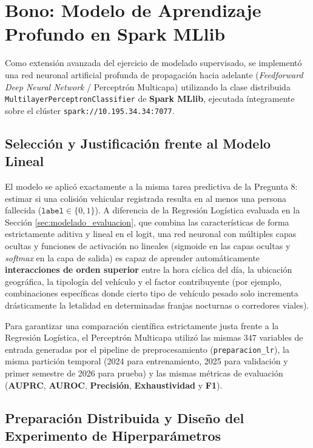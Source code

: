\section{Bono: Modelo de Aprendizaje Profundo en Spark MLlib}
\label{sec:bono_dl}

Como extensión avanzada del ejercicio de modelado supervisado, se implementó una red neuronal artificial profunda de propagación hacia adelante (\textit{Feedforward Deep Neural Network} / Perceptrón Multicapa) utilizando la clase distribuida \texttt{MultilayerPerceptronClassifier} de \textbf{Spark MLlib}, ejecutada íntegramente sobre el clúster \texttt{spark://10.195.34.34:7077}.

\subsection{Selección y Justificación frente al Modelo Lineal}
\label{subsec:bono_dl_seleccion}

El modelo se aplicó exactamente a la misma tarea predictiva de la Pregunta 8: estimar si una colisión vehicular registrada resulta en al menos una persona fallecida ($\texttt{label} \in \{0, 1\}$). A diferencia de la Regresión Logística evaluada en la Sección \ref{sec:modelado_evaluacion}, que combina las características de forma estrictamente aditiva y lineal en el logit, una red neuronal con múltiples capas ocultas y funciones de activación no lineales (sigmoide en las capas ocultas y \textit{softmax} en la capa de salida) es capaz de aprender automáticamente \textbf{interacciones de orden superior} entre la hora cíclica del día, la ubicación geográfica, la tipología del vehículo y el factor contribuyente (por ejemplo, combinaciones específicas donde cierto tipo de vehículo pesado solo incrementa drásticamente la letalidad en determinadas franjas nocturnas o corredores viales).

Para garantizar una comparación científica estrictamente justa frente a la Regresión Logística, el Perceptrón Multicapa utilizó las mismas $347$ variables de entrada generadas por el pipeline de preprocesamiento (\texttt{preparacion\_lr}), la misma partición temporal (2024 para entrenamiento, 2025 para validación y primer semestre de 2026 para prueba) y las mismas métricas de evaluación (\textbf{AUPRC}, \textbf{AUROC}, \textbf{Precisión}, \textbf{Exhaustividad} y \textbf{F1}).

\subsection{Preparación Distribuida y Diseño del Experimento de Hiperparámetros}
\label{subsec:bono_dl_experimento}

